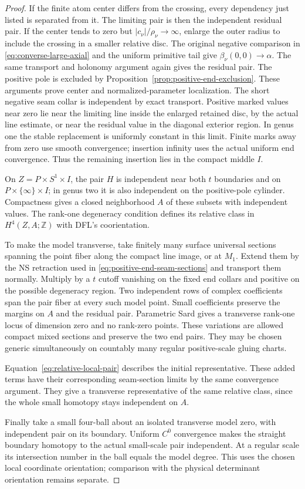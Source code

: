\documentclass[11pt]{amsart}
\theoremstyle{definition}
\theoremstyle{remark}
\theoremstyle{plain}
\begin{document}
\begin{proof}
If the finite atom center differs from the crossing, every
dependency just listed is separated from it. The limiting
pair is then the independent residual pair. If the center
tends to zero but $|c_\nu|/\rho_\nu\to\infty$, enlarge the
outer radius to include the crossing in a smaller relative
disc. The original negative comparison in
\eqref{eq:converse-large-axial} and the uniform primitive tail
give $\beta_\nu(0,0)\to\alpha$. The same transport and
holonomy argument again gives the residual pair.
The positive pole is excluded by
Proposition~\ref{prop:positive-end-exclusion}.
These arguments prove center and normalized-parameter localization.
The short negative seam collar is independent by exact transport.
Positive marked values near zero lie near the limiting line
inside the enlarged retained disc, by the actual line estimate,
or near the residual value in the diagonal exterior region.
In genus one the stable replacement is uniformly constant in
this limit. Finite marks away from zero use smooth convergence;
insertion infinity uses the actual uniform end convergence.
Thus the remaining insertion lies in the compact middle $I$.

On $Z=P\times S^1\times I$, the pair $H$ is independent
near both $t$ boundaries and on $P\times\{\infty\}\times I$;
in genus two it is also independent on the positive-pole
cylinder. Compactness gives a closed neighborhood $A$ of
these subsets with independent values. The rank-one
degeneracy condition defines its relative class in
$H^4(Z,A;\mathbb Z)$ with DFL's coorientation.

To make the model transverse, take finitely many surface
universal sections spanning the point fiber along the compact
line image, or at $M_1$. Extend them by the NS retraction
used in \eqref{eq:positive-end-seam-sections} and transport
them normally. Multiply by a $t$ cutoff vanishing on the
fixed end collars and positive on the possible degeneracy
region. Two independent rows of complex coefficients span
the pair fiber at every such model point. Small coefficients
preserve the margins on $A$ and the residual pair.
Parametric Sard gives a transverse rank-one locus of dimension
zero and no rank-zero points. These variations are allowed
compact mixed sections and preserve the two end pairs.
They may be chosen generic simultaneously on countably
many regular positive-scale gluing charts.

Equation~\eqref{eq:relative-local-pair} describes the initial
representative. These added terms have their corresponding
seam-section limits by the same convergence argument.
They give a transverse representative of the same relative
class, since the whole small homotopy stays independent on $A$.

Finally take a small four-ball about an isolated transverse
model zero, with independent pair on its boundary. Uniform
$C^0$ convergence makes the straight boundary homotopy to
the actual small-scale pair independent. At a regular scale
its intersection number in the ball equals the model degree.
This uses the chosen local coordinate orientation; comparison
with the physical determinant orientation remains separate.
\end{proof}
\end{document}
